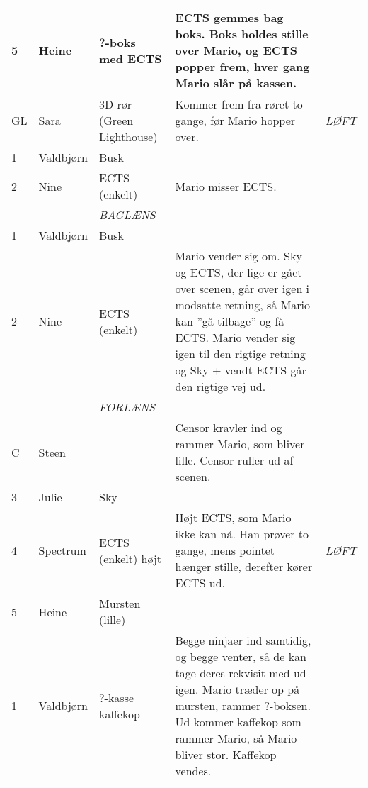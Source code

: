 \documentclass[a4paper,11pt]{article}
\begin{document}
\begin{sketch}
\begin{longtable}{|l||p{2cm}|p{3cm}|p{6.5cm}|p{1.3cm}|}
  5 & Heine & ?-boks med ECTS & ECTS gemmes bag boks. Boks holdes stille over Mario, og ECTS popper frem, hver gang Mario slår på kassen. & \\ \hline

  GL & Sara & 3D-rør (Green Lighthouse) & Kommer frem fra røret to gange, før Mario hopper over. & \textit{LØFT} \\ \hline

  1 & Valdbjørn & Busk & & \\ \hline

  2 & Nine & ECTS (enkelt) & Mario misser ECTS. & \\ \hline

  \cellcolor[gray]{0.9} & \cellcolor[gray]{0.9} & \cellcolor[gray]{0.9}  \textit{BAGLÆNS} & \cellcolor[gray]{0.9} & \cellcolor[gray]{0.9} \\ \hline

  1 & Valdbjørn & Busk & & \\ \hline

  2 & Nine & ECTS (enkelt) & Mario vender sig om. Sky og ECTS,
  der lige er gået over scenen, går over igen i modsatte retning, så Mario kan ”gå tilbage” og få ECTS. Mario vender sig igen til den rigtige retning og Sky + vendt ECTS går den rigtige vej ud. & \\ \hline

  \cellcolor[gray]{0.9} & \cellcolor[gray]{0.9} & \cellcolor[gray]{0.9} \textit{FORLÆNS} & \cellcolor[gray]{0.9} & \cellcolor[gray]{0.9} \\ \hline

  C & Steen & & Censor kravler ind og rammer Mario, som bliver lille. Censor ruller ud af scenen. & \\ \hline

  3 & Julie & Sky & & \\ \hline

  4 & Spectrum & ECTS (enkelt) højt & Højt ECTS, som Mario ikke kan nå. Han prøver to gange, mens pointet hænger stille, derefter kører ECTS ud. & \textit{LØFT} \\ \hline

  5 & Heine & Mursten (lille) & & \\ \hline

  1 & Valdbjørn & ?-kasse + kaffekop & Begge ninjaer ind samtidig, og begge venter, så de kan tage deres rekvisit med ud igen.
  Mario træder op på mursten, rammer ?-boksen. Ud kommer kaffekop som rammer Mario, så Mario bliver stor. Kaffekop vendes. & \\ \hline


\end{longtable}
\end{sketch}
\end{document}
